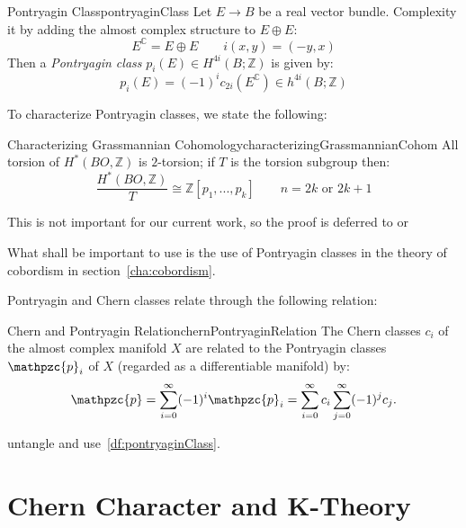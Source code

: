 \documentclass{book}
\newenvironment{Proof}[1][]
  {\begin{ProofTcb}[#1]}
  {\end{ProofTcb}}
\newcommand{\Z}{{\mathbb{Z}}}
\newcommand{\C}{{\mathbb{C}}}
\newcommand{\cp}{{\mathpzc{p}}}
\begin{document}
\begin{defn}{Pontryagin Class}{pontryaginClass}
  Let $E \to B$ be a real vector bundle. Complexity it by adding the almost complex structure to $E\oplus E$:
  \[
    E^\C = E\oplus E \qquad i(x,y) = (-y,x)
  \]
  Then a \emph{Pontryagin class} $p_i(E) \in H^{4i}(B; \Z)$ is given by:
  \[
    p_i(E) = (-1)^ic_{2i}(E^\C) \in h^{4i}(B;\Z)
  \]
\end{defn}

To characterize Pontryagin classes, we state the following:

\begin{prop}{Characterizing Grassmannian Cohomology}{characterizingGrassmannianCohom}
    All torsion of $H^*(BO, \Z)$ is $2$-torsion; if $T$ is the torsion subgroup then:
      \[
        \frac{H^*(BO, \Z)}{T} \cong \Z[p_1, ..., p_k] \qquad n = 2k\text{ or } 2k+1
      \]
\end{prop}

\begin{Proof}
  This is not important for our current work, so the proof is deferred to \cite{NateKTheory} or~\cite{hatcherVectorBundlesKTheory2017}
\end{Proof}

What shall be important to use is the use of Pontryagin classes in the theory of cobordism in
section~\ref{cha:cobordism}.

Pontryagin and Chern classes relate through the following relation:

\begin{thm}{Chern and Pontryagin Relation}{chernPontryaginRelation}
  The Chern classes $c_i$ of the almost complex manifold $X$ are related to the Pontryagin
  classes $\cp_i$ of $X$ (regarded as a differentiable manifold) by:
\[
    \cp = \sum_{i=0}^{\infty} (-1)^i \cp_i = \sum_{i=0}^{\infty} c_i \sum_{j=0}^{\infty} (-1)^j c_j.
\]
\end{thm}

\begin{Proof}
  untangle and use~\cref{df:pontryaginClass}.
\end{Proof}



\section{Chern Character and K-Theory}\label{sec:chernCharacter}
\end{document}
